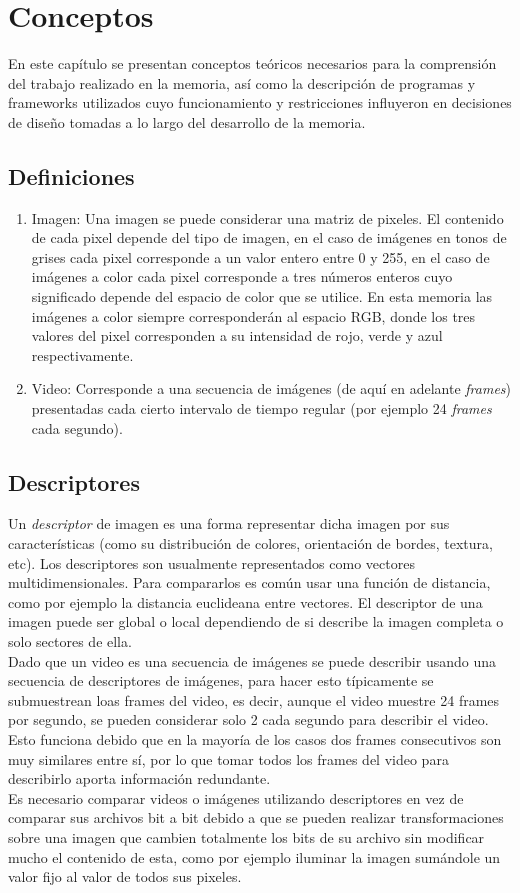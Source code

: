 \chapter{Conceptos}

En este capítulo se presentan conceptos teóricos necesarios para la comprensión del trabajo realizado en la memoria, así como la descripción de  programas y frameworks utilizados cuyo funcionamiento y restricciones influyeron en decisiones de diseño tomadas a lo largo del desarrollo de la memoria.

\section{Definiciones}
\begin{enumerate}
\item Imagen: Una imagen se puede considerar una matriz de pixeles. El contenido de cada pixel depende del tipo de imagen, en el caso de imágenes en tonos de grises cada pixel corresponde a un valor entero entre 0 y 255, en el caso de imágenes a color cada pixel corresponde a tres números enteros cuyo significado depende del espacio de color que se utilice. En esta memoria las imágenes a color siempre corresponderán al espacio RGB, donde los tres valores del pixel corresponden a su intensidad de rojo, verde y azul respectivamente.

\item Video: Corresponde a una secuencia de imágenes (de aquí en adelante \textit{frames}) presentadas cada cierto intervalo de tiempo regular (por ejemplo 24 \textit{frames} cada segundo). 
\end{enumerate}

\section{Descriptores}
Un \emph{descriptor} de imagen es una forma representar dicha imagen por sus características (como su distribución de colores, orientación de bordes, textura, etc). Los descriptores son usualmente representados como vectores multidimensionales. Para compararlos es común usar una función de distancia, como por ejemplo la distancia euclideana entre vectores.
El descriptor de una imagen puede ser global o local dependiendo de si describe la imagen completa o solo sectores de ella. \\
Dado que un video es una secuencia de imágenes se puede describir usando una secuencia de descriptores de imágenes, para hacer esto típicamente se submuestrean loas frames del video, es decir, aunque el video muestre 24 frames por segundo, se pueden considerar solo 2 cada segundo para describir el video. Esto funciona debido que en la mayoría de los casos dos frames consecutivos son muy similares entre sí, por lo que tomar todos los frames del video para describirlo aporta información redundante.\\
Es necesario comparar videos o imágenes utilizando descriptores en vez de comparar sus archivos bit a bit debido a que se pueden realizar transformaciones sobre una imagen que cambien totalmente los bits de su archivo sin modificar mucho el contenido de esta, como por ejemplo iluminar la imagen sumándole un valor fijo al valor de todos sus pixeles.

